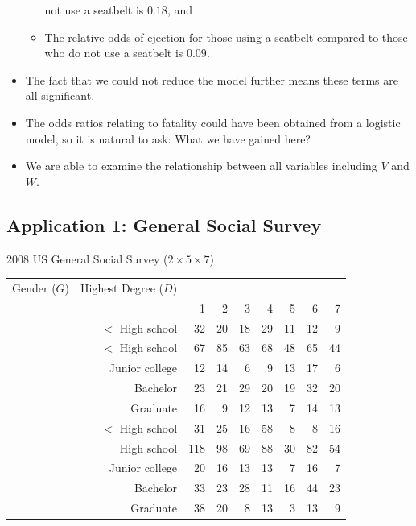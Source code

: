 \documentclass[oneside]{book}\usepackage[]{graphicx}\usepackage[svgnames]{xcolor}
\begin{document}
\begin{itemize}
\begin{itemize}
                    not use a seatbelt is $0.18$, and
              \item The relative odds of ejection for those using a seatbelt compared to those who do
                    not use a seatbelt is $0.09$.
          \end{itemize}
    \item The fact that we could not reduce the model further means these terms are all
          significant.
    \item The odds ratios relating to fatality could have been obtained from a logistic model,
          so it is natural to ask: What we have gained here?
    \item We are able to examine the relationship between all variables including $V$ and $W$.
\end{itemize}
\subsection*{Application 1: General Social Survey}
\begin{Example}{2008 US General Social Survey ($ 2\times 5\times 7 $)}
    \begin{center}
        \begin{NiceTabular}{crrrrrrrr}
            Gender ($ G $)     & Highest Degree ($ D $) &  \\
            &                        & 1  & 2  & 3  & 4  & 5  & 6  & 7 \\
            \midrule
               &
            $<$ High school      & 32                     & 20 & 18 & 29 & 11 & 12 & 9      \\
            &$<$ High school      & 67                     & 85 & 63 & 68 & 48 & 65 & 44     \\
            &Junior college       & 12                     & 14 & 6  & 9  & 13 & 17 & 6      \\
            &Bachelor             & 23                     & 21 & 29 & 20 & 19 & 32 & 20     \\
            &Graduate             & 16                     & 9  & 12 & 13 & 7  & 14 & 13     \\
            \midrule
             &
            $<$ High school      & 31                     & 25 & 16 & 58 & 8  & 8  & 16     \\
            &High school          & 118                    & 98 & 69 & 88 & 30 & 82 & 54     \\
            &Junior college       & 20                     & 16 & 13 & 13 & 7  & 16 & 7      \\
            &Bachelor             & 33                     & 23 & 28 & 11 & 16 & 44 & 23     \\
            &Graduate             & 38                     & 20 & 8  & 13 & 3  & 13 & 9      \\
            \bottomrule
        \end{NiceTabular}
    \end{center}
\end{Example}
\end{document}
